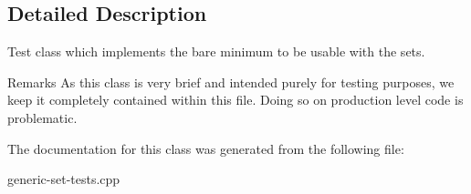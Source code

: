 \subsection{Detailed Description}
Test class which implements the bare minimum to be usable with the sets. 

\begin{DoxyRemark}{Remarks}
As this class is very brief and intended purely for testing purposes, we keep it completely contained within this file. Doing so on production level code is problematic. 
\end{DoxyRemark}


The documentation for this class was generated from the following file\-:\begin{DoxyCompactItemize}
\item 
generic-\/set-\/tests.\-cpp\end{DoxyCompactItemize}
